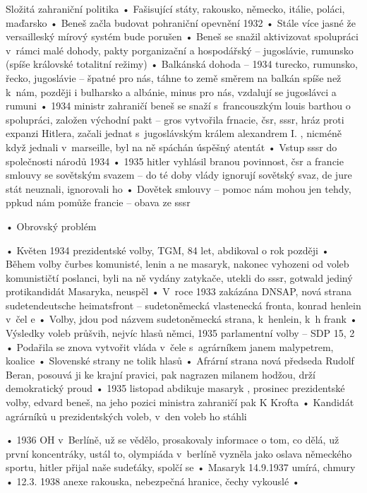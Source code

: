 \documentclass{article}
\begin{document}
Složitá zahraniční politika
    • Fašisující státy, rakousko, německo, itálie, poláci, maďarsko
    • Beneš začla budovat pohraniční opevnění 1932
    • Stále více jasné že versailleský mírový systém bude porušen
    • Beneš se snažil aktivizovat spolupráci v rámci malé dohody, pakty porganizační a hospodářský – jugoslávie, rumunsko (spíše královské totalitní režimy)
    • Balkánská dohoda – 1934 turecko, rumunsko, řecko, jugoslávie – špatné pro nás, táhne to země směrem na balkán spíše než k nám, později i bulharsko a albánie, minus pro nás, vzdalují se jugoslávci a rumuni
    • 1934 ministr zahraničí beneš se snaží s francouszkým louis barthou o spolupráci, založen východní pakt – gros vytvořila frnacie, čsr, sssr, hráz proti expanzi Hitlera, začali jednat s jugoslávským králem alexandrem I. , nicméně když jednali v marseille, byl na ně spáchán úspěšný atentát
    • Vstup sssr do společnosti národů 1934
    • 1935 hitler vyhlásil branou povinnost, čsr a francie smlouvy se sovětským svazem – do té doby vlády ignorují sovětský svaz, de jure stát neuznali, ignorovali ho
    • Dovětek smlouvy – pomoc nám mohou jen tehdy, ppkud nám pomůže francie – obava ze sssr

    • Obrovský problém

    • Květen 1934 prezidentské volby, TGM, 84 let, abdikoval o rok později
    • Během volby čurbes komunisté, lenin a ne masaryk, nakonec vyhozeni od voleb komunističtí poslanci, byli na ně vydány zatykače, utekli do sssr, gotwald jediný protikandidát Masaryka, neuspěl
    • V roce 1933 zakázána DNSAP, nová strana sudetendeutsche heimatsfront – sudetoněmecká vlastenecká fronta, konrad henlein v čel e
    • Volby, jdou pod názvem sudetoněmecká strana, k henlein, k h frank
    • Výsledky voleb průšvih, nejvíc hlasů němci, 1935 parlamentní volby – SDP 15, 2 %
    • Podařila se znova vytvořit vláda v čele s agrárníkem janem malypetrem, koalice
    • Slovenské strany ne tolik hlasů
    • Afrární strana nová předseda Rudolf Beran, posouvá ji ke krajní pravici, pak nagrazen milanem hodžou, drží demokratický proud
    • 1935 listopad abdikuje masaryk , prosinec prezidentské volby, edvard beneš, na jeho pozici ministra zahraničí pak K Krofta
    • Kandidát agrárníků u prezidentských voleb, v den voleb ho stáhli

    • 1936 OH v Berlíně, už se vědělo, prosakovaly informace o tom, co dělá, už první koncentráky, ustál to, olympiáda v berlíně vyzněla jako oslava německého sportu, hitler přijal naše sudeťáky, spolčí se
    • Masaryk 14.9.1937 umírá, chmury
    • 12.3. 1938 anexe rakouska, nebezpečná hranice, čechy vykouslé
    •
\end{document}
